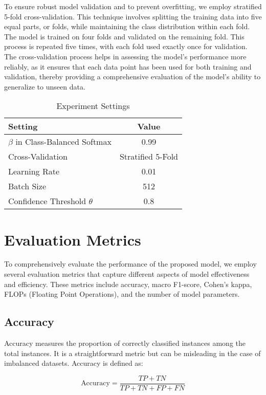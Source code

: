To ensure robust model validation and to prevent overfitting, we employ stratified 5-fold cross-validation. This technique involves splitting the training data into five equal parts, or folds, while maintaining the class distribution within each fold. The model is trained on four folds and validated on the remaining fold. This process is repeated five times, with each fold used exactly once for validation. The cross-validation process helps in assessing the model’s performance more reliably, as it ensures that each data point has been used for both training and validation, thereby providing a comprehensive evaluation of the model’s ability to generalize to unseen data.

\begin{table}[h]
\centering
\caption{Experiment Settings}
\begin{tabular}{|l|c|}
\hline
\textbf{Setting} & \textbf{Value} \\ \hline
\(\beta\) in Class-Balanced Softmax & 0.99 \\ \hline
Cross-Validation & Stratified 5-Fold \\ \hline
Learning Rate & 0.01 \\ \hline
Batch Size & 512 \\ \hline
Confidence Threshold \(\theta\) & 0.8 \\ \hline
\end{tabular}
\end{table}

\section{Evaluation Metrics}

\hspace{2em}To comprehensively evaluate the performance of the proposed model, we employ several evaluation metrics that capture different aspects of model effectiveness and efficiency. These metrics include accuracy, macro F1-score, Cohen's kappa, FLOPs (Floating Point Operations), and the number of model parameters.

\subsection{Accuracy}
Accuracy measures the proportion of correctly classified instances among the total instances. It is a straightforward metric but can be misleading in the case of imbalanced datasets. Accuracy is defined as:

\[
\text{Accuracy} = \frac{TP + TN}{TP + TN + FP + FN}
\]

